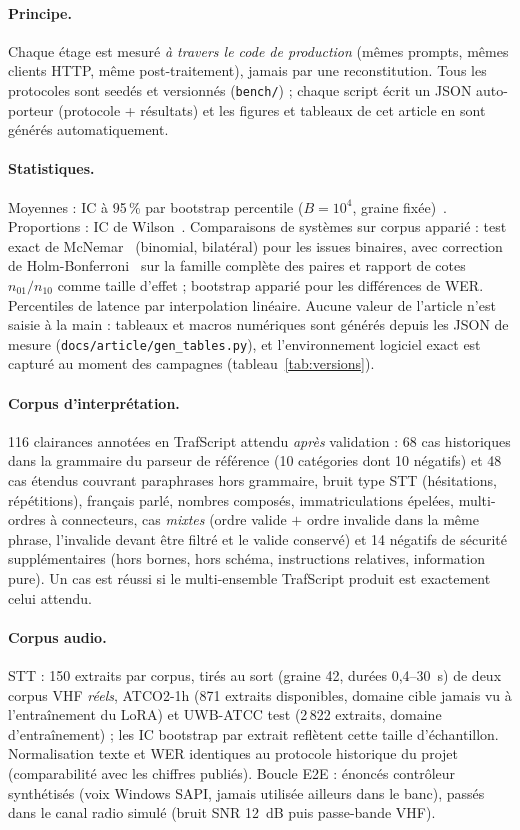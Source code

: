 \documentclass[10pt,a4paper]{article}
\newcommand{\syst}[1]{\texttt{#1}}
\begin{document}
\paragraph{Principe.} Chaque étage est mesuré \emph{à travers le code de
production} (mêmes prompts, mêmes clients HTTP, même post-traitement), jamais
par une reconstitution. Tous les protocoles sont seedés et versionnés
(\syst{bench/}) ; chaque script écrit un JSON auto-porteur (protocole +
résultats) et les figures et tableaux de cet article en sont générés
automatiquement.

\paragraph{Statistiques.} Moyennes : IC à 95\,\% par bootstrap percentile
($B=10^4$, graine fixée)~\cite{efron}. Proportions : IC de
Wilson~\cite{wilson}. Comparaisons de systèmes sur corpus apparié : test
exact de McNemar~\cite{mcnemar} (binomial, bilatéral) pour les issues
binaires, avec correction de Holm-Bonferroni~\cite{holm} sur la famille
complète des paires et rapport de cotes $n_{01}/n_{10}$ comme taille
d'effet ; bootstrap apparié pour les différences de WER. Percentiles de
latence par interpolation linéaire. Aucune valeur de l'article n'est saisie
à la main : tableaux et macros numériques sont générés depuis les JSON de
mesure (\syst{docs/article/gen\_tables.py}), et l'environnement logiciel
exact est capturé au moment des campagnes (tableau~\ref{tab:versions}).



\paragraph{Corpus d'interprétation.} 116 clairances annotées en TrafScript
attendu \emph{après} validation : 68 cas historiques dans la grammaire du
parseur de référence (10 catégories dont 10 négatifs) et 48 cas étendus couvrant paraphrases hors grammaire, bruit type STT (hésitations, répétitions),
français parlé, nombres composés, immatriculations épelées, multi-ordres à
connecteurs, cas \emph{mixtes} (ordre valide $+$ ordre invalide dans la même
phrase, l'invalide devant être filtré et le valide conservé) et 14 négatifs
de sécurité supplémentaires (hors bornes, hors schéma, instructions
relatives, information pure). Un cas est réussi si le multi-ensemble
TrafScript produit est exactement celui attendu.

\paragraph{Corpus audio.} STT : 150 extraits par corpus, tirés au sort
(graine 42, durées 0,4--30~s) de deux corpus VHF \emph{réels}, ATCO2-1h
(871 extraits disponibles, domaine cible jamais vu à l'entraînement du LoRA)
et UWB-ATCC test (2\,822 extraits, domaine d'entraînement) ; les IC
bootstrap par extrait reflètent cette taille d'échantillon. Normalisation texte et WER
identiques au protocole historique du projet (comparabilité avec les chiffres
publiés). Boucle E2E : énoncés contrôleur synthétisés (voix Windows SAPI,
jamais utilisée ailleurs dans le banc), passés dans le canal radio simulé
(bruit SNR 12~dB puis passe-bande VHF).
\end{document}
